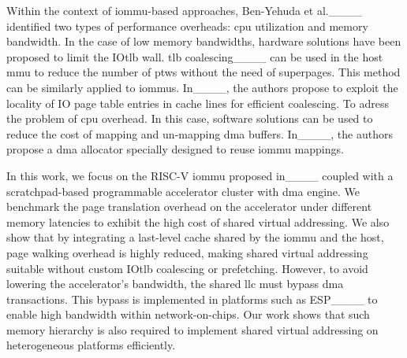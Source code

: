 Within the context of \gls{iommu}-based approaches, Ben-Yehuda et al.____ identified two types of performance overheads: \gls{cpu} utilization and memory bandwidth. In the case of low memory bandwidths, hardware solutions have been proposed to limit the IO\gls{tlb} wall. \gls{tlb} coalescing____ can be used in the host \gls{mmu} to reduce the number of \glspl{ptw} without the need of superpages. This method can be similarly applied to \glspl{iommu}. In____, the authors propose to exploit the locality of IO page table entries in cache lines for efficient coalescing. To adress the problem of \gls{cpu} overhead. In this case, software solutions can be used to reduce the cost of mapping and un-mapping \gls{dma} buffers. In____, the authors propose a \gls{dma} allocator specially designed to reuse \gls{iommu} mappings.

In this work, we focus on the RISC\nobreakdash-V \gls{iommu} proposed in____ coupled with a scratchpad-based programmable accelerator cluster with \gls{dma} engine. We benchmark the page translation overhead on the accelerator under different memory latencies to exhibit the high cost of shared virtual addressing. We also show that by integrating a last-level cache shared by the \gls{iommu} and the host, page walking overhead is highly reduced, making shared virtual addressing suitable without custom IO\gls{tlb} coalescing or prefetching. However, to avoid lowering the accelerator's bandwidth, the shared \gls{llc} must bypass \gls{dma} transactions. This bypass is implemented in platforms such as ESP____ to enable high bandwidth within network-on-chips. Our work shows that such memory hierarchy is also required to implement shared virtual addressing on heterogeneous platforms efficiently.

